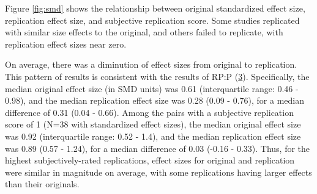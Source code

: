 \documentclass[
  english,
  a4paper,
]{article}
\begin{document}
Figure \ref{fig:smd} shows the relationship between original standardized effect size, replication effect size, and subjective replication score. Some studies replicated with similar size effects to the original, and others failed to replicate, with replication effect sizes near zero.

On average, there was a diminution of effect sizes from original to replication. This pattern of results is consistent with the results of RP:P (\protect\hyperlink{ref-openscienceconsortium2015}{3}). Specifically, the median original effect size (in SMD units) was 0.61 (interquartile range: 0.46 - 0.98), and the median replication effect size was 0.28 (0.09 - 0.76), for a median difference of 0.31 (0.04 - 0.66). Among the pairs with a subjective replication score of 1 (N=38 with standardized effect sizes), the median original effect size was 0.92 (interquartile range: 0.52 - 1.4), and the median replication effect size was 0.89 (0.57 - 1.24), for a median difference of 0.03 (-0.16 - 0.33). Thus, for the highest subjectively-rated replications, effect sizes for original and replication were similar in magnitude on average, with some replications having larger effects than their originals.
\end{document}
